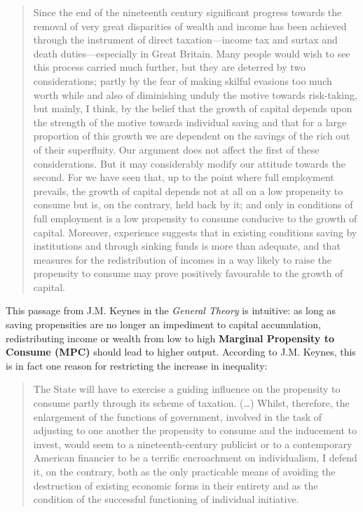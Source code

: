 \documentclass[]{book}
\begin{document}
\begin{quote}
Since the end of the nineteenth century significant progress towards the
removal of very great disparities of wealth and income has been achieved
through the instrument of direct taxation---income tax and surtax and
death duties---especially in Great Britain. Many people would wish to
see this process carried much further, but they are deterred by two
considerations; partly by the fear of making skilful evasions too much
worth while and also of diminishing unduly the motive towards
risk-taking, but mainly, I think, by the belief that the growth of
capital depends upon the strength of the motive towards individual
saving and that for a large proportion of this growth we are dependent
on the savings of the rich out of their superfluity. Our argument does
not affect the first of these considerations. But it may considerably
modify our attitude towards the second. For we have seen that, up to the
point where full employment prevails, the growth of capital depends not
at all on a low propensity to consume but is, on the contrary, held back
by it; and only in conditions of full employment is a low propensity to
consume conducive to the growth of capital. Moreover, experience
suggests that in existing conditions saving by institutions and through
sinking funds is more than adequate, and that measures for the
redistribution of incomes in a way likely to raise the propensity to
consume may prove positively favourable to the growth of capital.
\end{quote}

This passage from J.M. Keynes in the \emph{General Theory} is intuitive:
as long as saving propensities are no longer an impediment to capital
accumulation, redistributing income or wealth from low to high
\textbf{Marginal Propensity to Consume (MPC)} should lead to higher
output. According to J.M. Keynes, this is in fact one reason for
restricting the increase in inequality:

\begin{quote}
The State will have to exercise a guiding influence on the propensity to
consume partly through its scheme of taxation. (\ldots{}) Whilst,
therefore, the enlargement of the functions of government, involved in
the task of adjusting to one another the propensity to consume and the
inducement to invest, would seem to a nineteenth-century publicist or to
a contemporary American financier to be a terrific encroachment on
individualism, I defend it, on the contrary, both as the only
practicable means of avoiding the destruction of existing economic forms
in their entirety and as the condition of the successful functioning of
individual initiative.
\end{quote}
\end{document}

